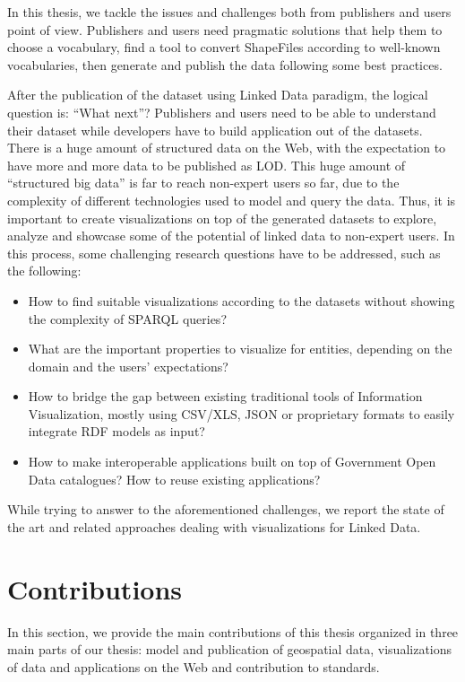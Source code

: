 In this thesis, we tackle the issues and challenges both from publishers and users point of view. Publishers and users need pragmatic solutions that help them to choose a vocabulary, find a tool to convert ShapeFiles according to well-known vocabularies, then generate and publish the data following some best practices.

After the publication of the dataset using Linked Data paradigm, the logical question is: ``What next''? Publishers and users need to be able to understand their dataset while developers have to build application out of the datasets. There is a huge amount of structured data on the Web, with the expectation to have more and more data to be published as LOD. This huge amount of ``structured big data'' is far to reach non-expert users so far, due to the complexity of different technologies used to model and query the data. Thus, it is important to create visualizations on top of the generated datasets to explore, analyze and showcase
some of the potential of linked data to non-expert users. In this process, some challenging research questions have to be addressed, such as the following:
\begin{itemize}
 \item  How to find suitable visualizations according to the datasets without showing the complexity of SPARQL queries?
 \item  What are the important properties to visualize for entities, depending on the domain and the users' expectations?
 \item  How to bridge the gap between existing traditional tools of Information Visualization, mostly using CSV/XLS, JSON or proprietary formats to easily integrate RDF models as input?
 \item How to make interoperable applications built on top of Government Open Data catalogues? How to reuse existing applications?
\end{itemize}
While trying to answer to the aforementioned challenges, we report the state of the art and related approaches dealing with visualizations for Linked Data.

\section{Contributions}
\label{sec:contributions}
In this section, we provide the main contributions of this thesis organized in three main parts of our thesis: model and publication of geospatial data, visualizations of data and applications on the Web and contribution to standards.

